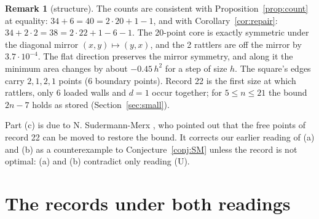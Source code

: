 \documentclass[11pt]{amsart}
\theoremstyle{definition}
\newtheorem{remark}[theorem]{Remark}
\begin{document}
\begin{remark}[structure]
The counts are consistent with Proposition~\ref{prop:count} at equality: $34 + 6 = 40 = 2\cdot20 + 1 - 1$, and with Corollary~\ref{cor:repair}: $34 + 2\cdot 2 = 38 = 2\cdot22 + 1 - 6 - 1$. The 20-point core is exactly symmetric under the diagonal mirror $(x,y)\mapsto(y,x)$, and the 2 rattlers are off the mirror by $3.7\cdot10^{-4}$. The flat direction preserves the mirror symmetry, and along it the minimum area changes by about $-0.45\,h^2$ for a step of size $h$. The square's edges carry $2, 1, 2, 1$ points (6 boundary points). Record 22 is the first size at which rattlers, only 6 loaded walls and $d = 1$ occur together; for $5 \le n \le 21$ the bound $2n-7$ holds as stored (Section~\ref{sec:small}). %
\end{remark}

Part (c) is due to N. Sudermann-Merx \cite{SMpc}, who pointed out that the free points of record 22 can be moved to restore the bound. It corrects our earlier reading of (a) and (b) as a counterexample to Conjecture~\ref{conj:SM} unless the record is not optimal: (a) and (b) contradict only reading (U).

\section{The records under both readings}\label{sec:more}
\end{document}
